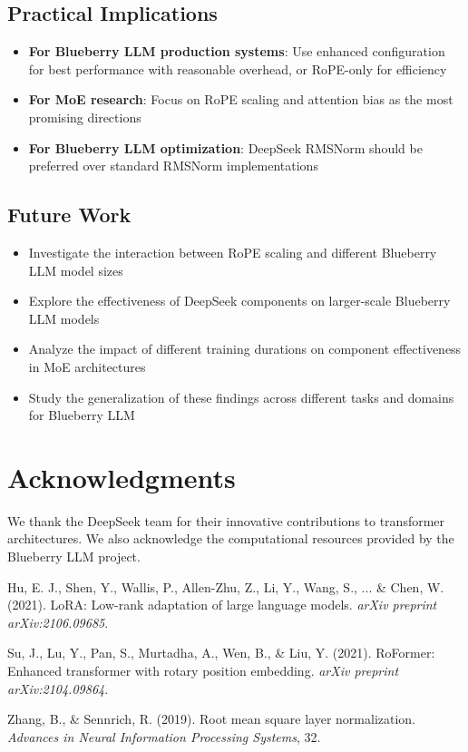 \documentclass[11pt,a4paper]{article}
\begin{document}
\subsection{Practical Implications}

\begin{itemize}
    \item \textbf{For Blueberry LLM production systems}: Use enhanced configuration for best performance with reasonable overhead, or RoPE-only for efficiency
    \item \textbf{For MoE research}: Focus on RoPE scaling and attention bias as the most promising directions
    \item \textbf{For Blueberry LLM optimization}: DeepSeek RMSNorm should be preferred over standard RMSNorm implementations
\end{itemize}

\subsection{Future Work}

\begin{itemize}
    \item Investigate the interaction between RoPE scaling and different Blueberry LLM model sizes
    \item Explore the effectiveness of DeepSeek components on larger-scale Blueberry LLM models
    \item Analyze the impact of different training durations on component effectiveness in MoE architectures
    \item Study the generalization of these findings across different tasks and domains for Blueberry LLM
\end{itemize}

\section*{Acknowledgments}

We thank the DeepSeek team for their innovative contributions to transformer architectures. We also acknowledge the computational resources provided by the Blueberry LLM project.

\begin{thebibliography}{9}

Hu, E. J., Shen, Y., Wallis, P., Allen-Zhu, Z., Li, Y., Wang, S., ... \& Chen, W. (2021).
\newblock LoRA: Low-rank adaptation of large language models.
\newblock \textit{arXiv preprint arXiv:2106.09685}.

Su, J., Lu, Y., Pan, S., Murtadha, A., Wen, B., \& Liu, Y. (2021).
\newblock RoFormer: Enhanced transformer with rotary position embedding.
\newblock \textit{arXiv preprint arXiv:2104.09864}.

Zhang, B., \& Sennrich, R. (2019).
\newblock Root mean square layer normalization.
\newblock \textit{Advances in Neural Information Processing Systems}, 32.

\end{thebibliography}
\end{document}
